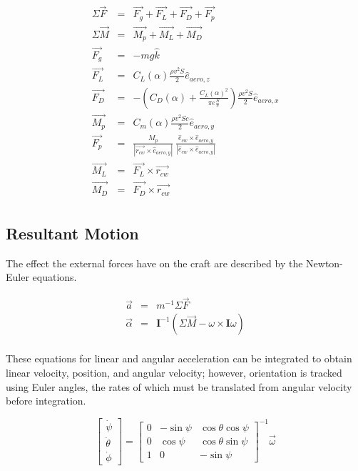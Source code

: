 \documentclass{sydeStyle}
\begin{document}
\begin{eqnarray*}
\Sigma \vec{F} &=& \vec{F_g} + \vec{F_L} + \vec{F_D} + \vec{F_p} \\
\Sigma \vec{M} &=& \vec{M_p} + \vec{M_L} + \vec{M_D} \\
\vec{F_g} &=& -mg\hat{k} \\
\vec{F_L} &=& C_L(\alpha) \frac{\rho v^2 S}{2}\hat{e}_{aero,z} \\
\vec{F_D} &=& -(C_D(\alpha) + \frac{C_L(\alpha)^2}{\pi e \frac{S}{c}})\frac{\rho v^2 S}{2}\hat{e}_{aero,x} \\
\vec{M_p} &=& C_m(\alpha) \frac{\rho v^2 S c}{2} \hat{e}_{aero,y} \\
\vec{F_p} &=& \frac{M_p}{| \vec{r_{cw}} \times \hat{e}_{aero,y} |} \
    \frac{\hat{e}_{cw} \times \hat{e}_{aero,y}}{|\hat{e}_{cw} \times \hat{e}_{aero,y}|} \\
\vec{M_L} &=& \vec{F_L} \times \vec{r_{cw}} \\
\vec{M_D} &=& \vec{F_D} \times \vec{r_{cw}} \\
\end{eqnarray*}

\subsection{Resultant Motion}

The effect the external forces have on the craft are described by the
Newton-Euler equations.

\begin{eqnarray*}
\vec{a} &=& m^{-1} \Sigma \vec{F} \\
\vec{\alpha} &=& \textbf{I}^{-1}(\Sigma \vec{M} - \omega \times \textbf{I} \omega) \\
\end{eqnarray*}

These equations for linear and angular acceleration can be integrated to obtain
linear velocity, position, and angular velocity; however, orientation is tracked
using Euler angles, the rates of which must be translated from angular velocity
before integration.

\begin{displaymath}
\left[ \begin{matrix}
\dot{\psi} \\
\dot{\theta} \\
\dot{\phi}
\end{matrix} \right] = \left[ \begin{matrix}
0 & -\sin \psi &  \cos \theta \cos \psi \\
0 &  \cos \psi &  \cos \theta \sin \psi \\
1 & 0          & -\sin \psi
\end{matrix} \right] ^{-1} \vec{\omega}
\end{displaymath}
\end{document}
